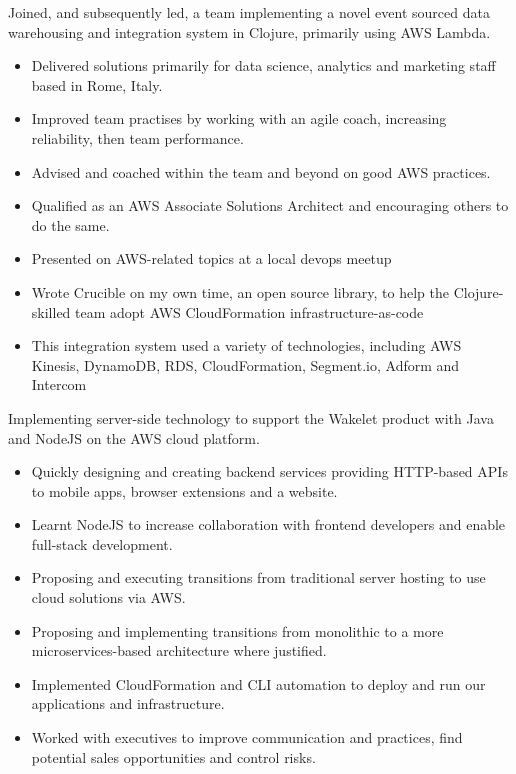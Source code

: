 \documentclass[11pt,a4paper,sans]{moderncv}        %
\begin{document}
{Joined, and subsequently led, a team implementing a novel event sourced data warehousing and integration system in Clojure, primarily using AWS Lambda.
\newline{}
\begin{itemize}
\item Delivered solutions primarily for data science, analytics and marketing staff based in Rome, Italy.
\item Improved team practises by working with an agile coach, increasing reliability, then team performance.
\item Advised and coached within the team and beyond on good AWS practices.
\item Qualified as an AWS Associate Solutions Architect and encouraging others to do the same.
\item Presented on AWS-related topics at a local devops meetup
\item Wrote Crucible on my own time, an open source library, to help the Clojure-skilled team adopt AWS CloudFormation infrastructure-as-code
\item This integration system used a variety of technologies, including AWS Kinesis, DynamoDB, RDS, CloudFormation, Segment.io, Adform and  Intercom
\end{itemize}
}

{Implementing server-side technology to support the Wakelet product with Java and NodeJS on the AWS cloud platform.
\newline{}
\begin{itemize}
\item Quickly designing and creating backend services providing HTTP-based APIs to mobile apps, browser extensions and a website.
\item Learnt NodeJS to increase collaboration with frontend developers and enable full-stack development.
\item Proposing and executing transitions from traditional server hosting to use cloud solutions via AWS.
\item Proposing and implementing transitions from monolithic to a more microservices-based architecture where justified.
\item Implemented CloudFormation and CLI automation to deploy and run our applications and infrastructure.
\item Worked with executives to improve communication and practices, find potential sales opportunities and control risks.
\end{itemize}
}
\end{document}
